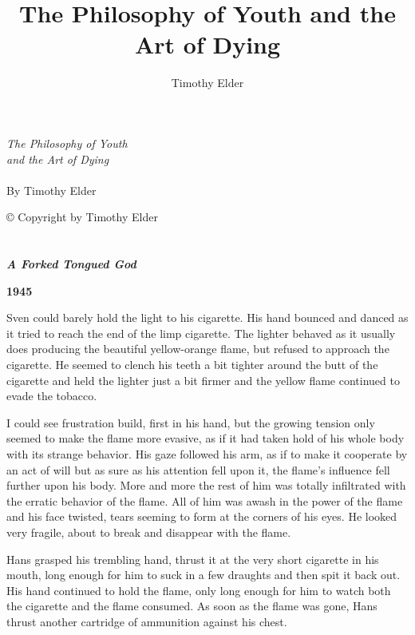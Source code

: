 \documentclass[14pt,a4paper]{memoir}
\title{The Philosophy of Youth and the Art of Dying}
\author{Timothy Elder}
\begin{document}
\clearpage
\vspace*{\fill}
\begin{center}
\begin{minipage}{.6\textwidth}
  \emph{The Philosophy of Youth}\\
  \emph{and the Art of Dying } \\
  \\
  By Timothy Elder
\end{minipage}
\end{center}
\mbox{}
\vfill %
\tiny © Copyright by Timothy Elder\\
\thispagestyle{empty} %
\clearpage %
\clearpage

\newpage

\chapter{ }

\centerline{\textbf{\textit{A Forked Tongued God}}}

\bigskip

\textbf{1945}

\bigskip

Sven could barely hold the light to his cigarette. His hand bounced and danced as it tried to reach the end of the limp cigarette. The lighter behaved as it usually does producing the beautiful yellow-orange flame, but refused to approach the cigarette. He seemed to clench his teeth a bit tighter around the butt of the cigarette and held the lighter just a bit firmer and the yellow flame continued to evade the tobacco.

I could see frustration build, first in his hand, but the growing tension only seemed to make the flame more evasive, as if it had taken hold of his whole body with its strange behavior. His gaze followed his arm, as if to make it cooperate by an act of will but as sure as his attention fell upon it, the flame’s influence fell further upon his body. More and more the rest of him was totally infiltrated with the erratic behavior of the flame. All of him was awash in the power of the flame and his face twisted, tears seeming to form at the corners of his eyes. He looked very fragile, about to break and disappear with the flame.

Hans grasped his trembling hand, thrust it at the very short cigarette in his mouth, long enough for him to suck in a few draughts and then spit it back out. His hand continued to hold the flame, only long enough for him to watch both the cigarette and the flame consumed. As soon as the flame was gone, Hans thrust another cartridge of ammunition against his chest.
\end{document}
